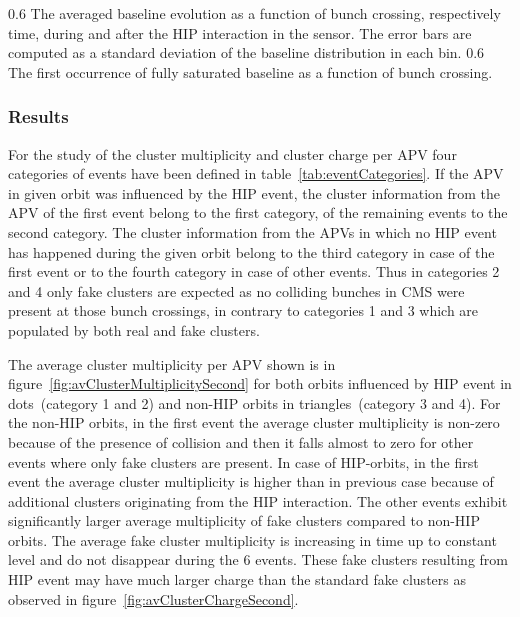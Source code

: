                  {0.6}       %
                 {The averaged baseline evolution as a function of bunch crossing, respectively time, during and after the HIP interaction in the sensor. The error bars are computed as a standard deviation of the baseline distribution in each bin.  } %
                 {0.6}       %
                 { The first occurrence of fully saturated baseline as a function of bunch crossing. } %
 
\subsubsection{Results}

For the study of the cluster multiplicity and cluster charge per APV four categories of events have been defined in table~\ref{tab:eventCategories}. If the APV in given orbit was influenced by the HIP event, the cluster information from the APV of the first event belong to the first category, of the remaining events to the second category. The cluster information from the APVs in which no HIP event has happened during the given orbit belong to the third category in case of the first event or to the fourth category in case of other events. Thus in categories 2 and 4 only fake clusters are expected as no colliding bunches in CMS were present at those bunch crossings, in contrary to categories 1 and 3 which are populated by both real and fake clusters.

The average cluster multiplicity per APV shown is in figure~\ref{fig:avClusterMultiplicitySecond} for both orbits influenced by HIP event in dots~(category 1 and 2) and non-HIP orbits in triangles~(category 3 and 4). For the non-HIP orbits, in the first event the average cluster multiplicity is non-zero because of the presence of collision and then it falls almost to zero for other events where only fake clusters are present. In case of HIP-orbits, in the first event the average cluster multiplicity is higher than in previous case because of additional clusters originating from the HIP interaction. The other events exhibit significantly larger average multiplicity of fake clusters compared to non-HIP orbits. The average fake cluster multiplicity is increasing in time up to constant level and do not disappear during the 6 events. These fake clusters resulting from HIP event may have much larger charge than the standard fake clusters as observed in figure~\ref{fig:avClusterChargeSecond}. 

